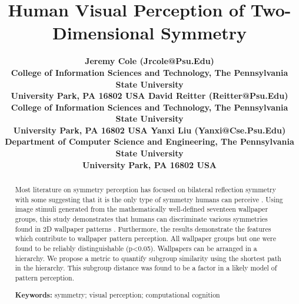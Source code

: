\documentclass[10pt,letterpaper]{article}
\title{Human Visual Perception of Two-Dimensional Symmetry}
\author{\large \bf Jeremy Cole {(Jrcole@Psu.Edu)} \\
College of Information Sciences and Technology, The Pennsylvania State University \\
University Park, PA 16802 USA
\AND \large \bf David Reitter {(Reitter@Psu.Edu)} \\
College of Information Sciences and Technology, The Pennsylvania State University \\
University Park, PA 16802 USA
  \AND \large \bf Yanxi Liu {(Yanxi@Cse.Psu.Edu)} \\
  Department of Computer Science and Engineering, The Pennsylvania State University \\
University Park, PA 16802 USA
}
\newcommand{\citep}[1]{\cite{#1}}
\begin{document}
\maketitle


\begin{abstract}
Most literature on symmetry perception has focused on bilateral reflection symmetry with some suggesting that it is the only type of symmetry humans can perceive \citep{bio}. Using image stimuli generated from the mathematically well-defined seventeen wallpaper groups, this study demonstrates that humans can discriminate various symmetries found in 2D wallpaper patterns \citep{yanxitrends}. Furthermore, the results demonstrate the features which contribute to wallpaper pattern perception. All wallpaper groups but one were found to be reliably distinguishable (p<0.05). Wallpapers can be arranged in a hierarchy. We propose a metric to quantify subgroup similarity using the shortest path in the hierarchy. This subgroup distance was found to be a factor in a likely model of pattern perception. 

\textbf{Keywords:} 
symmetry; visual perception; computational cognition
\end{abstract}



%









\setlength{\bibleftmargin}{.125in}
\setlength{\bibindent}{-\bibleftmargin}


\end{document}
